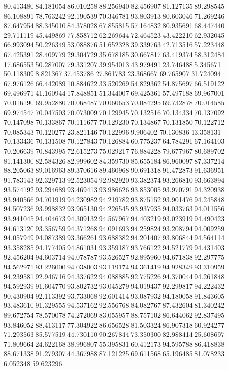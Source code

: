 80.413480
84.181054
86.010258
88.256940
82.456907
81.127135
89.298545
86.108891
78.763242
92.190539
70.346781
93.803913
80.603046
71.269246
87.647954
88.345010
84.378028
67.855815
57.164832
80.935691
68.447440
29.711119
45.449869
77.858712
62.269644
72.464523
43.422210
62.932045
66.993094
50.226349
53.088876
51.652328
39.339763
42.713516
57.223448
67.425391
28.409779
29.304729
35.678185
30.667817
63.419374
58.312484
17.686553
50.287007
79.331207
39.954013
43.979491
23.746488
5.345671
50.118309
8.821367
37.453786
27.861783
23.368667
69.765907
31.724094
67.976126
66.442089
10.884622
33.520269
54.829362
54.875697
66.519122
69.496971
41.160944
17.848851
51.344007
69.425361
57.497188
69.967001
70.016190
69.952880
70.068487
70.060653
70.084295
69.732878
70.014585
69.974547
70.047503
70.073009
70.129945
70.132516
70.134334
70.137092
70.147098
70.133867
70.111677
70.129230
70.134867
70.131850
70.122712
70.085343
70.120277
23.821146
70.122996
9.906402
70.130836
13.358131
70.133436
70.131508
70.127843
70.126884
60.775237
64.784291
67.164103
70.206639
70.843995
72.615273
75.029217
76.884228
79.677967
80.689702
81.141300
82.584326
82.999602
84.359730
85.655184
86.960097
87.337214
88.205063
89.016963
89.370616
89.460968
90.691318
91.472873
91.636951
91.783143
92.329713
92.523054
92.982920
93.382374
93.266810
93.663894
93.574192
93.294689
93.469413
93.986626
93.853005
93.970791
94.320938
93.940566
94.701919
94.230982
94.219782
93.875152
93.901476
94.245848
94.507236
93.998832
93.965130
94.226545
93.937935
94.033763
94.011556
93.941045
94.404673
94.309132
94.567967
94.403219
93.023919
94.490423
94.613120
93.356759
94.371268
94.091693
94.259824
93.208794
94.009259
94.057949
94.087389
93.366261
93.688382
94.201407
93.806844
94.564114
93.358285
94.177405
94.861031
93.359187
93.766122
94.521779
94.431403
92.456204
94.603714
94.078787
93.526527
92.895960
94.671838
92.297775
94.562971
93.226000
94.038003
93.119174
94.361419
94.928349
93.310959
94.239581
92.946716
94.337622
94.088885
92.775226
94.370044
94.261848
94.592939
91.604770
93.802732
93.045279
94.019437
92.299817
94.222432
90.430904
92.113392
93.733068
92.601414
93.087932
94.180058
91.843605
93.483610
91.329555
94.537162
92.556768
84.082767
87.432604
81.340242
89.672754
78.570078
74.272069
83.055957
88.757102
86.644062
92.837495
93.846052
88.413117
77.304922
86.656528
81.503324
86.907318
60.924277
71.293563
85.577519
44.730110
90.267844
73.350300
82.988414
25.608697
71.809664
24.622168
38.996807
55.395831
60.412173
94.595788
86.418838
88.671338
91.279307
44.367988
87.121225
69.611568
65.196485
81.078233
6.052348
59.623296
